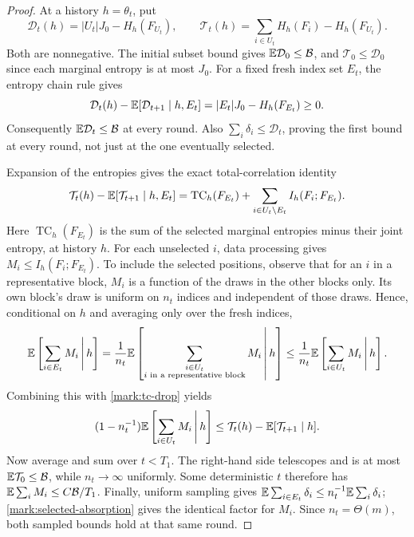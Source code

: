 \begin{proof}
At a history $h=\theta_t$, put
\[
 \mathcal D_t(h)=|U_t|J_0-H_h(F_{U_t}),\qquad
 \mathcal T_t(h)=\sum_{i\in U_t}H_h(F_i)-H_h(F_{U_t}).
\]
Both are nonnegative. The initial subset bound gives
$\mathbb E\mathcal D_0\le\mathcal B$, and
$\mathcal T_0\le\mathcal D_0$ since each marginal entropy is at most
$J_0$. For a fixed fresh index set $E_t$, the entropy chain rule gives
\[
 \mathcal D_t(h)
 -\mathbb E[\mathcal D_{t+1}\mid h,E_t]
       =|E_t|J_0-H_h(F_{E_t})\ge0.
\]
Consequently $\mathbb E\mathcal D_t\le\mathcal B$ at every round. Also
$\sum_i\delta_i\le\mathcal D_t$, proving the first bound at every
round, not just at the one eventually selected.

Expansion of the entropies gives the exact total-correlation identity
\begin{equation}\label{mark:tc-drop}
 \mathcal T_t(h)-\mathbb E[\mathcal T_{t+1}\mid h,E_t]
 =\operatorname{TC}_h(F_{E_t})+
        \sum_{i\in U_t\setminus E_t}I_h(F_i;F_{E_t}).
\end{equation}
Here $\operatorname{TC}_h(F_{E_t})$ is the sum of the selected marginal
entropies minus their joint entropy, at history $h$.
For each unselected $i$, data processing gives
$M_i\le I_h(F_i;F_{E_t})$. To include the selected positions, observe
that for an $i$ in a representative block, $M_i$ is a function of
the draws in the other blocks only. Its own block's draw is uniform
on $n_t$ indices and independent of those draws. Hence, conditional
on $h$ and averaging only over the fresh indices,
\begin{equation}\label{mark:selected-absorption}
 \mathbb E\left[\sum_{i\in E_t}M_i\,\middle|\,h\right]
 =\frac1{n_t}\mathbb E\left[
    \sum_{\substack{i\in U_t\\i\text{ in a representative block}}}
                      M_i\,\middle|\,h\right]
 \le\frac1{n_t}\mathbb E\left[\sum_{i\in U_t}M_i\,\middle|\,h\right].
\end{equation}
Combining this with \eqref{mark:tc-drop} yields
\[
 (1-n_t^{-1})\mathbb E\left[\sum_{i\in U_t}M_i\,\middle|\,h\right]
 \le \mathcal T_t(h)-\mathbb E[\mathcal T_{t+1}\mid h].
\]
Now average and sum over $t<T_1$. The right-hand side telescopes and
is at most $\mathbb E\mathcal T_0\le\mathcal B$, while $n_t\to\infty$
uniformly. Some deterministic $t$ therefore has
$\mathbb E\sum_iM_i\le C\mathcal B/T_1$.
Finally, uniform sampling gives
$\mathbb E\sum_{i\in E_t}\delta_i\le n_t^{-1}\mathbb E\sum_i\delta_i$;
\eqref{mark:selected-absorption} gives the identical factor for $M_i$.
Since $n_t=\Theta(m)$, both sampled bounds hold at that same round.
\end{proof}

